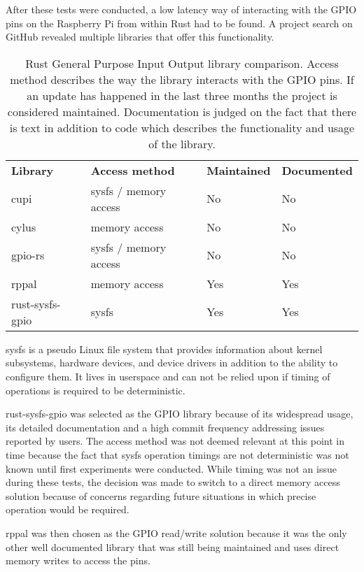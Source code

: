 After these tests were conducted, a low latency way of interacting with the GPIO pins on the Raspberry Pi from within Rust had to be found. A project search on GitHub revealed multiple libraries that offer this functionality. 

\begin{table}[h]
\centering
\begin{tabular}{llll}
\textbf{Library} & \textbf{Access method} & \textbf{Maintained} & \textbf{Documented} \\
cupi             & sysfs / memory access  & No                  & No                  \\
cylus            & memory access          & No                  & No                  \\
gpio-rs          & sysfs / memory access  & No                  & No                  \\
rppal            & memory access          & Yes                 & Yes                 \\
rust-sysfs-gpio  & sysfs                  & Yes                 & Yes
\end{tabular}
\caption{Rust General Purpose Input Output library comparison. Access method describes the way the library interacts with the GPIO pins. If an update has happened in the last three months the project is considered maintained. Documentation is judged on the fact that there is text in addition to code which describes the functionality and usage of the library.}
\end{table}

sysfs is a pseudo Linux file system that provides information about kernel subsystems, hardware devices, and device drivers in addition to the ability to configure them. It lives in userspace and can not be relied upon if timing of operations is required to be deterministic. 

rust-sysfs-gpio \cite{rust-sysfs-gpio} was selected as the GPIO library because of its widespread usage, its detailed documentation and a high commit frequency addressing issues reported by users. The access method was not deemed relevant at this point in time because the fact that sysfs operation timings are not deterministic was not known until first experiments were conducted. While timing was not an issue during these tests, the decision was made to switch to a direct memory access solution because of concerns regarding future situations in which precise operation would be required. 

rppal \cite{rppal} was then chosen as the GPIO read/write solution because it was the only other well documented library that was still being maintained and uses direct memory writes to access the pins.


